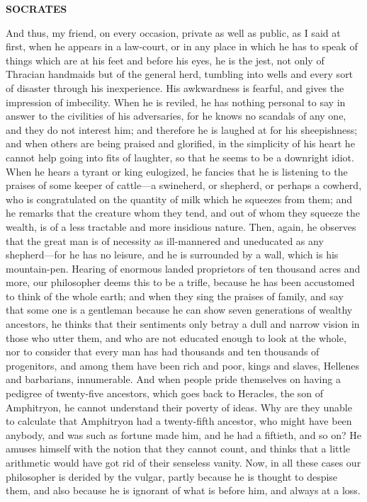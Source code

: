\documentclass[11pt,letter]{article}
\begin{document}
\par \textbf{SOCRATES}
\par   And thus, my friend, on every occasion, private as well as public, as I said at first, when he appears in a law-court, or in any place in which he has to speak of things which are at his feet and before his eyes, he is the jest, not only of Thracian handmaids but of the general herd, tumbling into wells and every sort of disaster through his inexperience. His awkwardness is fearful, and gives the impression of imbecility. When he is reviled, he has nothing personal to say in answer to the civilities of his adversaries, for he knows no scandals of any one, and they do not interest him; and therefore he is laughed at for his sheepishness; and when others are being praised and glorified, in the simplicity of his heart he cannot help going into fits of laughter, so that he seems to be a downright idiot. When he hears a tyrant or king eulogized, he fancies that he is listening to the praises of some keeper of cattle—a swineherd, or shepherd, or perhaps a cowherd, who is congratulated on the quantity of milk which he squeezes from them; and he remarks that the creature whom they tend, and out of whom they squeeze the wealth, is of a less tractable and more insidious nature. Then, again, he observes that the great man is of necessity as ill-mannered and uneducated as any shepherd—for he has no leisure, and he is surrounded by a wall, which is his mountain-pen. Hearing of enormous landed proprietors of ten thousand acres and more, our philosopher deems this to be a trifle, because he has been accustomed to think of the whole earth; and when they sing the praises of family, and say that some one is a gentleman because he can show seven generations of wealthy ancestors, he thinks that their sentiments only betray a dull and narrow vision in those who utter them, and who are not educated enough to look at the whole, nor to consider that every man has had thousands and ten thousands of progenitors, and among them have been rich and poor, kings and slaves, Hellenes and barbarians, innumerable. And when people pride themselves on having a pedigree of twenty-five ancestors, which goes back to Heracles, the son of Amphitryon, he cannot understand their poverty of ideas. Why are they unable to calculate that Amphitryon had a twenty-fifth ancestor, who might have been anybody, and was such as fortune made him, and he had a fiftieth, and so on? He amuses himself with the notion that they cannot count, and thinks that a little arithmetic would have got rid of their senseless vanity. Now, in all these cases our philosopher is derided by the vulgar, partly because he is thought to despise them, and also because he is ignorant of what is before him, and always at a loss.
\end{document}
